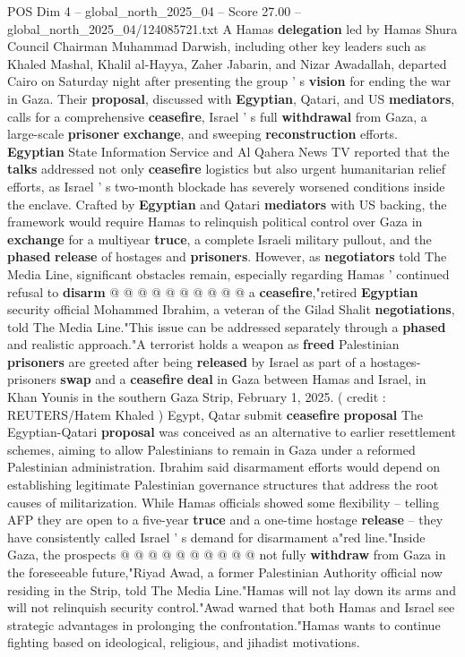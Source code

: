 \begin{textsample}{POS Dim 4 – global\_north\_2025\_04 – Score 27.00 – global\_north\_2025\_04/124085721.txt}  \label{ex:f4_pos_211}
A Hamas \textbf{delegation} led by Hamas Shura Council Chairman Muhammad Darwish, including other key leaders such as Khaled Mashal, Khalil al-Hayya, Zaher Jabarin, and Nizar Awadallah, departed Cairo on Saturday night after presenting the group ' s \textbf{vision} for ending the war in Gaza.
Their \textbf{proposal}, discussed with \textbf{Egyptian}, Qatari, and US \textbf{mediators}, calls for a comprehensive \textbf{ceasefire}, Israel ' s full \textbf{withdrawal} from Gaza, a large-scale \textbf{prisoner} \textbf{exchange}, and sweeping \textbf{reconstruction} efforts. \textbf{Egyptian} State Information Service and Al Qahera News TV reported that the \textbf{talks} addressed not only \textbf{ceasefire} logistics but also urgent humanitarian relief efforts, as Israel ' s two-month blockade has severely worsened conditions inside the enclave.
Crafted by \textbf{Egyptian} and Qatari \textbf{mediators} with US backing, the framework would require Hamas to relinquish political control over Gaza in \textbf{exchange} for a multiyear \textbf{truce}, a complete Israeli military pullout, and the \textbf{phased} \textbf{release} of hostages and \textbf{prisoners}.
However, as \textbf{negotiators} told The Media Line, significant obstacles remain, especially regarding Hamas ' continued refusal to \textbf{disarm} @ @ @ @ @ @ @ @ @ @ a \textbf{ceasefire},"retired \textbf{Egyptian} security official Mohammed Ibrahim, a veteran of the Gilad Shalit \textbf{negotiations}, told The Media Line."This issue can be addressed separately through a \textbf{phased} and realistic approach."A terrorist holds a weapon as \textbf{freed} Palestinian \textbf{prisoners} are greeted after being \textbf{released} by Israel as part of a hostages-prisoners \textbf{swap} and a \textbf{ceasefire} \textbf{deal} in Gaza between Hamas and Israel, in Khan Younis in the southern Gaza Strip, February 1, 2025. ( credit : REUTERS/Hatem Khaled ) Egypt, Qatar submit \textbf{ceasefire} \textbf{proposal} The Egyptian-Qatari \textbf{proposal} was conceived as an alternative to earlier resettlement schemes, aiming to allow Palestinians to remain in Gaza under a reformed Palestinian administration.
Ibrahim said disarmament efforts would depend on establishing legitimate Palestinian governance structures that address the root causes of militarization.
While Hamas officials showed some flexibility -- telling AFP they are open to a five-year \textbf{truce} and a one-time hostage \textbf{release} -- they have consistently called Israel ' s demand for disarmament a"red line."Inside Gaza, the prospects @ @ @ @ @ @ @ @ @ @ not fully \textbf{withdraw} from Gaza in the foreseeable future,"Riyad Awad, a former Palestinian Authority official now residing in the Strip, told The Media Line."Hamas will not lay down its arms and will not relinquish security control."Awad warned that both Hamas and Israel see strategic advantages in prolonging the confrontation."Hamas wants to continue fighting based on ideological, religious, and jihadist motivations.

\end{textsample}
